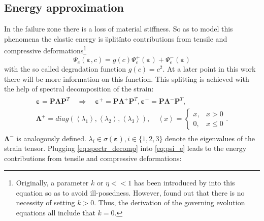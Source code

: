 \subsection{Energy approximation} \label{sec:energy_approx}
In the failure zone there is a loss of material stiffness. So as to model this phenomena the elastic energy is \"split\" into contributions from tensile and compressive deformations\footnote{Originally, a parameter $k$ or $\eta<<1$ has been introduced by \citet{09_PF_k} into this equation so as to avoid ill-posedness. However, \citet{01_PF_dyn_brittle} found out that there is no necessity of setting $k>0$. Thus, the derivation of the governing evolution equations all include that $k=0$.}
\begin{equation} \label{eq:el_energy}
	\Psi_{e}\left(\bm{\varepsilon},c\right)=g\left(c\right) \Psi_{e}^{+}\left(\bm{\varepsilon}\right)+\Psi_{e}^{-}\left(\bm{\varepsilon}\right)
\end{equation}
with the so called degradation function $g\left(c\right)=c^{2}$. At a later point in this work there will be more information on this function. This splitting is achieved with the help of spectral decomposition of the strain:
\begin{align} \label{eq:spectr_decomp}
	\begin{aligned}
		\bm{\varepsilon} = \mathbf{P}\bm{\Lambda}\mathbf{P}^{T} \quad \Rightarrow \quad \bm{\varepsilon}^{+} = \mathbf{P}\bm{\Lambda}^{+}\mathbf{P}^{T},  \bm{\varepsilon}^{-} = \mathbf{P}\bm{\Lambda}^{-}\mathbf{P}^{T}, \\
		\bm{\Lambda}^{+}=diag\left(\left<\lambda_{1}\right>,\left<\lambda_{2}\right>,\left<\lambda_{3}\right>\right), \quad \left<x\right>=\begin{cases}x, &x>0 \\ 0, & x\leq0\end{cases}.
	\end{aligned}
\end{align}
$\bm{\Lambda}^{-}$ is analogously                                                                                                                                                                                                                                                                                                                                                                                                                                                                                                          defined. $\lambda_{i}\in\sigma\left(\bm{\varepsilon}\right),i\in\{1,2,3\}$ denote the eigenvalues of the strain tensor. Plugging \eqref{eq:spectr_decomp} into \eqref{eq:psi_e} leads to the energy contributions from tensile and compressive deformations:
